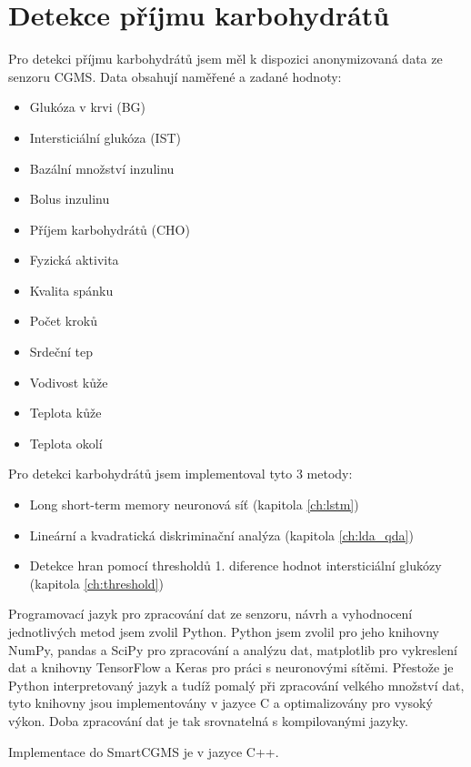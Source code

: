 \chapter{Detekce příjmu karbohydrátů}

Pro detekci příjmu karbohydrátů jsem měl k dispozici anonymizovaná data ze senzoru CGMS. Data obsahují naměřené a zadané hodnoty:
\begin{itemize}
\setlength\itemsep{0em}
\item Glukóza v krvi (BG)
\item Intersticiální glukóza (IST)
\item Bazální množství inzulinu
\item Bolus inzulinu
\item Příjem karbohydrátů (CHO)
\item Fyzická aktivita
\item Kvalita spánku
\item Počet kroků
\item Srdeční tep
\item Vodivost kůže
\item Teplota kůže
\item Teplota okolí
\end{itemize}

Pro detekci karbohydrátů jsem implementoval tyto 3 metody:
\begin{itemize}
\setlength\itemsep{0em}
\item Long short-term memory neuronová síť (kapitola \ref{ch:lstm})
\item Lineární a kvadratická diskriminační analýza (kapitola \ref{ch:lda_qda})
\item Detekce hran pomocí thresholdů 1. diference hodnot intersticiální glukózy \\(kapitola \ref{ch:threshold})
\end{itemize}

Programovací jazyk pro zpracování dat ze senzoru, návrh a vyhodnocení jednotlivých metod jsem zvolil Python. Python jsem zvolil pro jeho knihovny NumPy, pandas a SciPy pro zpracování a analýzu dat, matplotlib pro vykreslení dat a knihovny TensorFlow a Keras pro práci s neuronovými sítěmi. Přestože je Python interpretovaný jazyk a tudíž pomalý při zpracování velkého množství dat, tyto knihovny jsou implementovány v jazyce C a optimalizovány pro vysoký výkon. Doba zpracování dat je tak srovnatelná s kompilovanými jazyky.

Implementace do SmartCGMS je v jazyce C++.

